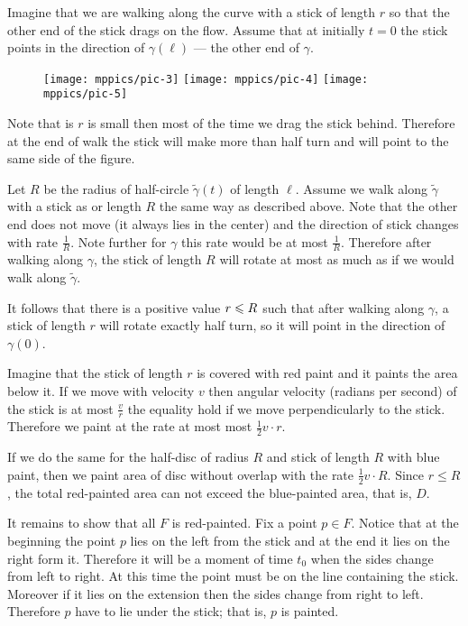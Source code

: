 Imagine that we are walking along the curve with a stick of length $r$ so that the other end of the stick drags on the flow.
Assume that at initially $t=0$ the stick points in the direction of $\gamma(\ell)$ --- the other end of $\gamma$.

\begin{wrapfigure}{r}{34 mm}
\vskip-0mm
\centering
\texttt{[image: mppics/pic-3]}
\bigskip
\texttt{[image: mppics/pic-4]}
\bigskip
\texttt{[image: mppics/pic-5]}
\end{wrapfigure}

Note that is $r$ is small then most of the time we drag the stick behind. Therefore at the end of walk the stick will make more than half turn and will point to the same side of the figure.

Let $R$ be the radius of half-circle $\tilde\gamma(t)$ of length $\ell$.
Assume we walk along $\tilde\gamma$  with a stick as or length $R$ the same way as described above.
Note that the other end does not move (it always lies in the center) and the direction of stick changes with rate $\tfrac1R$.
Note further for $\gamma$ this rate would be at most $\tfrac1R$.
Therefore after walking along $\gamma$,
the stick of length $R$ will rotate at most as much as if we would walk along $\tilde\gamma$.

It follows that there is a positive value $r\z\le R$ such that after walking along $\gamma$, a stick of length $r$ will rotate exactly half turn, so it will point in the direction of $\gamma(0)$.

Imagine that the stick of length $r$ is covered with red paint and it paints the area below it.
If we move with velocity $v$ then angular velocity (radians per second) of the stick is at most $\tfrac vr$ the equality hold if we move perpendicularly to the stick.
Therefore we paint at the rate at most most $\tfrac12 v\cdot r$.

If we do the same for the half-disc of radius $R$ and stick of length $R$ with blue paint,
then we paint area of disc without overlap with the rate $\tfrac12 v\cdot R$.
Since $r\le R$, the total red-painted area can not exceed the blue-painted area, that is, $D$. 

It remains to show that all $F$ is red-painted.
Fix a point $p\in F$.
Notice that at the beginning the point $p$ lies on the left from the stick and at the end it lies on the right form it.
Therefore it will be a moment of time $t_0$ when the sides change from left to right.
At this time the point must be on the line containing the stick. 
Moreover if it lies on the extension then the sides change from right to left. Therefore $p$ have to lie under the stick; that is, $p$ is painted.
\qeds

